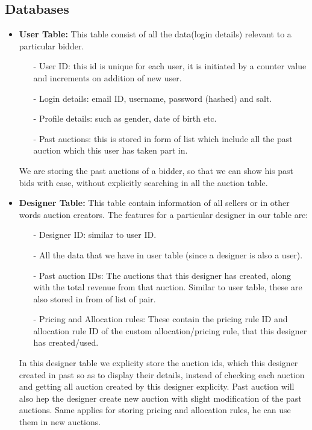 \documentclass[a4paper]{article}
\begin{document}
\subsection*{Databases}
\begin{itemize}
    \item \textbf{User Table:} This table consist of all the data(login details) relevant to a particular bidder.
    \begin{itemize}
        \item[-] User ID: this id is unique for each user, it is initiated by a counter value and increments on addition of new user.
        \item[-] Login details: email ID, username, password (hashed) and salt.
        \item[-] Profile details: such as gender, date of birth etc.
        \item[-] Past auctions: this is stored in form of list which include all the past auction which this user has taken part in.

    \end{itemize}
    We are storing the past auctions of a bidder, so that we can show his past bids with ease, without explicitly searching in all the auction table.

    \item \textbf{Designer Table:} This table contain information of all sellers or in other words auction creators. 
    The features for a particular designer in our table are:
    \begin{itemize}
        \item[-] Designer ID: similar to user ID.
        \item[-] All the data that we have in user table (since a designer is also a user).
        \item[-] Past auction IDs: The auctions that this designer has created, along with the total revenue from that auction. Similar to user table, these are also stored in from of list of pair.
        \item[-] Pricing and Allocation rules: These contain the pricing rule ID and allocation rule ID of the custom allocation/pricing rule, that this designer has created/used.
    \end{itemize}
    In this designer table we explicity store the auction ids, which this designer created in past so as to display their details, instead of checking each auction and getting all auction created by this designer explicity. 
    Past auction will also hep the designer create new auction with slight modification of the past auctions. 
    Same applies for storing pricing and allocation rules, he can use them in new auctions.


\end{itemize}
\end{document}
